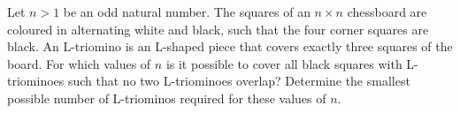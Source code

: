 Let $n>1$ be an odd natural number. The squares of an $n \times n$ chessboard are coloured
in alternating white and black, such that the four corner squares are black.
An L-triomino is an L-shaped piece that covers exactly three squares of the board.
For which values of $n$ is it possible to cover all black squares with L-triominoes such that no
two L-triominoes overlap?
Determine the smallest possible number of L-triominos required for these values of $n$.